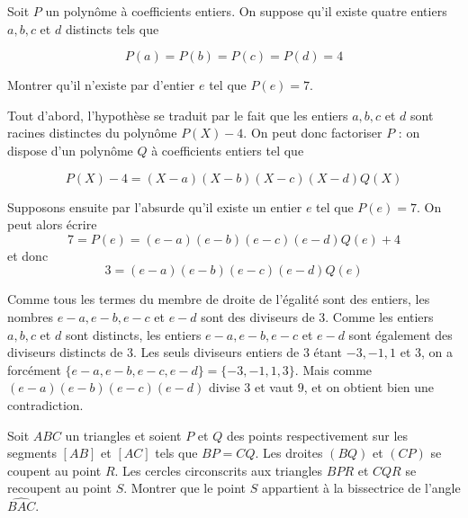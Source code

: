 \begin{exo}
Soit $P$ un polynôme à coefficients entiers. On suppose qu'il existe quatre entiers $a,b,c$ et $d$ distincts tels que 

\[P(a)=P(b)=P(c)=P(d)=4\]

Montrer qu'il n'existe par d'entier $e$ tel que $P(e)=7$. 
\end{exo}
\begin{sol}
Tout d'abord, l'hypothèse se traduit par le fait que les entiers $a,b,c$ et $d$ sont racines distinctes du polynôme $P(X)-4$. On peut donc factoriser $P$ : on dispose d'un polynôme $Q$ à coefficients entiers tel que 

\[P(X)-4= (X-a)(X-b)(X-c)(X-d)Q(X)\]

Supposons ensuite par l'absurde qu'il existe un entier $e$ tel que $P(e)=7$. On peut alors écrire
$$7=P(e)=(e-a)(e-b)(e-c)(e-d)Q(e) +4$$
et donc
$$3=(e-a)(e-b)(e-c)(e-d)Q(e)$$

Comme tous les termes du membre de droite de l'égalité sont des entiers, les nombres $e-a,e-b,e-c$ et $e-d$ sont des diviseurs de $3$. Comme les entiers $a,b,c$ et $d$ sont distincts, les entiers $e-a,e-b,e-c$ et $e-d$ sont également des diviseurs distincts de $3$. Les seuls diviseurs entiers de $3$ étant $-3,-1,1$ et $3$, on a forcément $\{e-a,e-b,e-c,e-d\}=\{-3,-1,1,3\}$. Mais comme $(e-a)(e-b)(e-c)(e-d)$ divise $3$ et vaut $9$, et on obtient bien une contradiction.
\end{sol}


\begin{exo}
Soit $ABC$ un triangles et soient $P$ et $Q$ des points respectivement sur les segments $[AB]$ et $[AC]$ tels que $BP=CQ$. Les droites $(BQ)$ et $(CP)$ se coupent au point $R$. Les cercles circonscrits aux triangles $BPR$ et $CQR$ se recoupent au point $S$. Montrer que le point $S$ appartient à la bissectrice de l'angle $\widehat{BAC}$. 
\end{exo}

